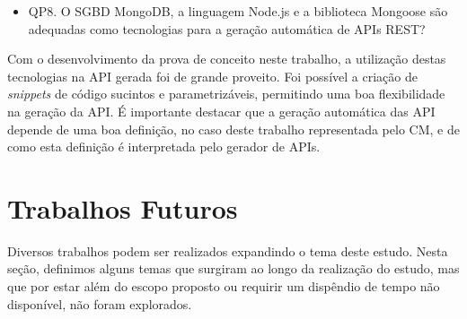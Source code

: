 \begin{itemize}
	\item QP8. O SGBD MongoDB, a linguagem Node.js e a biblioteca Mongoose são adequadas como tecnologias para a geração automática de APIs REST?
\end{itemize}

Com o desenvolvimento da prova de conceito neste trabalho, a utilização destas tecnologias na API gerada foi de grande proveito. Foi possível a criação de \textit{snippets} de código sucintos e parametrizáveis, permitindo uma boa flexibilidade na geração da API. É importante destacar que a geração automática das API depende de uma boa definição, no caso deste trabalho representada pelo CM, e de como esta definição é interpretada pelo gerador de APIs.


\section{Trabalhos Futuros}

Diversos trabalhos podem ser realizados expandindo o tema deste estudo. Nesta seção, definimos alguns temas que surgiram ao longo da realização do estudo, mas que por estar além do escopo proposto ou requirir um dispêndio de tempo não disponível, não foram explorados.

